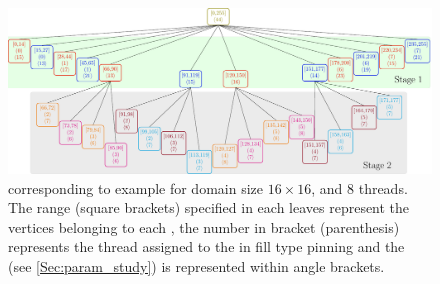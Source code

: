 	 \begin{figure}[thbp]
		 \includegraphics[width=\textwidth, height=0.2\textheight]{pics/recursion/2d-7pt_example/tree/tree}
	 	\caption{\levelTree corresponding to \STEX example for domain size $16 \times 16$, and 8 threads. The range (square brackets) specified in each leaves represent the vertices belonging to each \levelGroup, the number in bracket (parenthesis) represents the thread assigned to the \levelGroup in fill type pinning and the \nrowsEff (see \cref{Sec:param_study}) is represented within angle brackets.}
	 	\label{fig:rec_2d-7pt_tree}
	 \end{figure}

